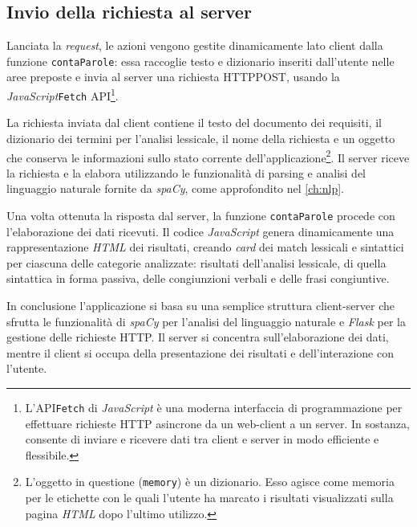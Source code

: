 \documentclass[12pt]{report}
\newcommand{\javascript}{\textsl{JavaScript}\xspace}
\newcommand{\flask}{\textsl{Flask}\xspace}
\newcommand{\spacy}{\textsl{spaCy}\xspace}
\newcommand{\html}{\textsl{HTML}\xspace}
\newcommand{\api}{\textsf{API}\xspace}
\newcommand{\http}{\textsf{HTTP}\xspace}
\newcommand{\post}{\textsf{POST}\xspace}
\begin{document}
\subsection{Invio della richiesta al server}
Lanciata la \textit{request}, le azioni vengono gestite dinamicamente lato client dalla funzione \texttt{contaParole}: essa raccoglie testo e dizionario inseriti dall'utente nelle aree preposte e invia al server una richiesta \http \post, usando la \javascript \texttt{Fetch} \api\footnote{L'\api \texttt{Fetch} di \javascript è una moderna interfaccia di programmazione per effettuare richieste \http asincrone da un web-client a un server. In sostanza, consente di inviare e ricevere dati tra client e server in modo efficiente e flessibile.}.

La richiesta inviata dal client contiene il testo del documento dei requisiti, il dizionario dei termini per l'analisi lessicale, il nome della richiesta e un oggetto che conserva le informazioni sullo stato corrente dell'applicazione\footnote{L'oggetto in questione (\texttt{memory}) è un dizionario. Esso agisce come memoria per le etichette con le quali l'utente ha marcato i risultati visualizzati sulla pagina \html dopo l'ultimo utilizzo.}. Il server riceve la richiesta e la elabora utilizzando le funzionalità di parsing e analisi del linguaggio naturale fornite da \spacy, come approfondito nel \cref{ch:nlp}.

Una volta ottenuta la risposta dal server, la funzione \texttt{contaParole} procede con l'elaborazione dei dati ricevuti. Il codice \javascript genera dinamicamente una rappresentazione \html dei risultati, creando \textit{card} dei match lessicali e sintattici per ciascuna delle categorie analizzate: risultati dell'analisi lessicale, di quella sintattica in forma passiva, delle congiunzioni verbali e delle frasi congiuntive.

In conclusione l'applicazione si basa su una semplice struttura client-server che sfrutta le funzionalità di \spacy per l'analisi del linguaggio naturale e \flask per la gestione delle richieste \http. Il server si concentra sull'elaborazione dei dati, mentre il client si occupa della presentazione dei risultati e dell'interazione con l'utente.
\end{document}

